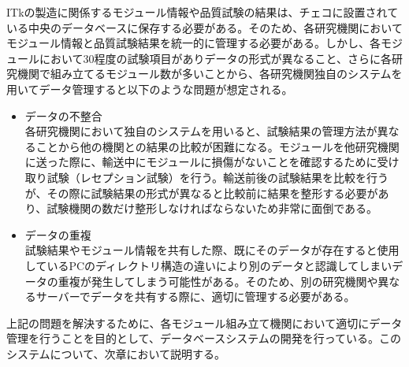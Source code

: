 ITkの製造に関係するモジュール情報や品質試験の結果は、チェコに設置されている中央のデータベースに保存する必要がある。そのため、各研究機関においてモジュール情報と品質試験結果を統一的に管理する必要がある。しかし、各モジュールにおいて$30$程度の試験項目がありデータの形式が異なること、さらに各研究機関で組み立てるモジュール数が多いことから、各研究機関独自のシステムを用いてデータ管理すると以下のような問題が想定される。
\begin{itemize}
  \item データの不整合 \\
  各研究機関において独自のシステムを用いると、試験結果の管理方法が異なることから他の機関との結果の比較が困難になる。モジュールを他研究機関に送った際に、輸送中にモジュールに損傷がないことを確認するために受け取り試験（レセプション試験）を行う。輸送前後の試験結果を比較を行うが、その際に試験結果の形式が異なると比較前に結果を整形する必要があり、試験機関の数だけ整形しなければならないため非常に面倒である。
  \item データの重複 \\
  試験結果やモジュール情報を共有した際、既にそのデータが存在すると使用しているPCのディレクトリ構造の違いにより別のデータと認識してしまいデータの重複が発生してしまう可能性がある。そのため、別の研究機関や異なるサーバーでデータを共有する際に、適切に管理する必要がある。
\end{itemize}

上記の問題を解決するために、各モジュール組み立て機関において適切にデータ管理を行うことを目的として、データベースシステムの開発を行っている。このシステムについて、次章において説明する。

\newpage
